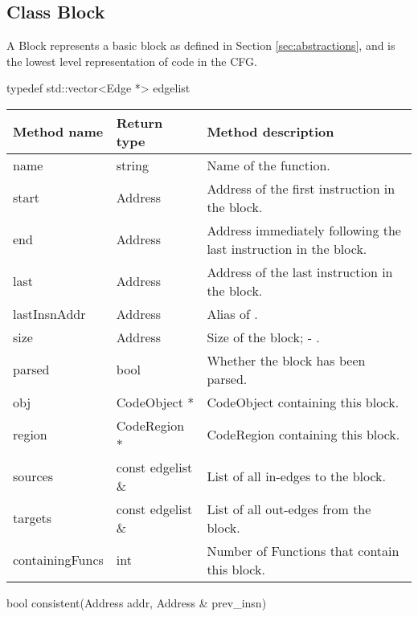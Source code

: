 \subsection{Class Block}


A Block represents a basic block as defined in Section \ref{sec:abstractions}, and is the lowest level representation of code in the CFG.

\begin{apient}
typedef std::vector<Edge *> edgelist
\end{apient}

\begin{tabular}{p{1.25in}p{1.125in}p{3.125in}}
	Method name & Return type & Method description \\
	\hline
	name & string & Name of the function. \\
	start & Address & Address of the first instruction in the block. \\
	end & Address & Address immediately following the last instruction in the block. \\
	last & Address & Address of the last instruction in the block. \\
	lastInsnAddr & Address & Alias of \code{last}. \\
	size & Address & Size of the block; \code{end} - \code{start}. \\
	parsed & bool & Whether the block has been parsed. \\
	obj & CodeObject * & CodeObject containing this block. \\
	region & CodeRegion * & CodeRegion containing this block. \\
	sources & const edgelist \& & List of all in-edges to the block. \\
	targets & const edgelist \& & List of all out-edges from the block. \\
	containingFuncs & int & Number of Functions that contain this block. \\
\end{tabular}

\begin{apient}
bool consistent(Address addr, Address & prev_insn)
\end{apient}

